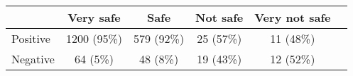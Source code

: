 \begin{tabular}{l c|c|c|c|c} \hline  & Very safe & Safe & Not safe & Very not safe \\ 
\hline Positive & 1200 (95\%) & 579 (92\%) & 25 (57\%) & 11 (48\%) \\ 
  Negative & 64 (5\%) & 48 (8\%) & 19 (43\%) & 12 (52\%) \\ 
 \hline \end{tabular}